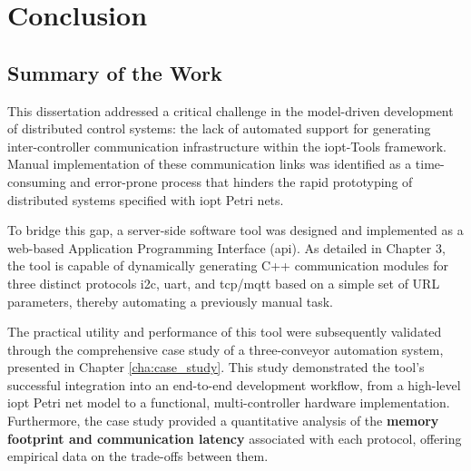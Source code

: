 
%

\chapter{Conclusion}
\label{cha:conclusion}

\section{Summary of the Work}
\label{sec:summary}

This dissertation addressed a critical challenge in the model-driven development of distributed control systems: the lack of automated support for generating inter-controller communication infrastructure within the \gls{iopt}-Tools framework. Manual implementation of these communication links was identified as a time-consuming and error-prone process that hinders the rapid prototyping of distributed systems specified with \gls{iopt} Petri nets.

To bridge this gap, a server-side software tool was designed and implemented as a web-based Application Programming Interface (\gls{api}). As detailed in Chapter 3, the tool is capable of dynamically generating C++ communication modules for three distinct protocols \gls{i2c}, \gls{uart}, and \gls{tcp}/\gls{mqtt}                                                                                                                                                                                                                                                                                                                                                                                                                                                                                                                                                      based on a simple set of URL parameters, thereby automating a previously manual task.

The practical utility and performance of this tool were subsequently validated through the comprehensive case study of a three-conveyor automation system, presented in Chapter \ref{cha:case_study}. This study demonstrated the tool's successful integration into an end-to-end development workflow, from a high-level \gls{iopt} Petri net model to a functional, multi-controller hardware implementation. Furthermore, the case study provided a quantitative analysis of the  \textbf{memory footprint and communication latency} associated with each protocol, offering empirical data on the trade-offs between them.


